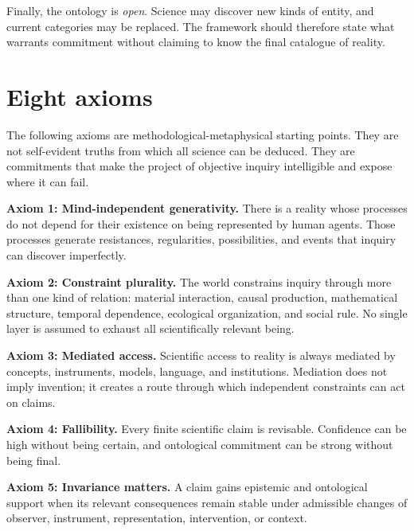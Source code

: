Finally, the ontology is \emph{open}. Science may discover new kinds of entity,
and current categories may be replaced. The framework should therefore state
what warrants commitment without claiming to know the final catalogue of
reality.

\section{Eight axioms}

The following axioms are methodological-metaphysical starting points. They are
not self-evident truths from which all science can be deduced. They are
commitments that make the project of objective inquiry intelligible and expose
where it can fail.

\begin{principlebox}
\textbf{Axiom 1: Mind-independent generativity.} There is a reality whose
processes do not depend for their existence on being represented by human
agents. Those processes generate resistances, regularities, possibilities, and
events that inquiry can discover imperfectly.
\end{principlebox}

\begin{principlebox}
\textbf{Axiom 2: Constraint plurality.} The world constrains inquiry through
more than one kind of relation: material interaction, causal production,
mathematical structure, temporal dependence, ecological organization, and
social rule. No single layer is assumed to exhaust all scientifically relevant
being.
\end{principlebox}

\begin{principlebox}
\textbf{Axiom 3: Mediated access.} Scientific access to reality is always
mediated by concepts, instruments, models, language, and institutions. Mediation
does not imply invention; it creates a route through which independent
constraints can act on claims.
\end{principlebox}

\begin{principlebox}
\textbf{Axiom 4: Fallibility.} Every finite scientific claim is revisable.
Confidence can be high without being certain, and ontological commitment can
be strong without being final.
\end{principlebox}

\begin{principlebox}
\textbf{Axiom 5: Invariance matters.} A claim gains epistemic and ontological
support when its relevant consequences remain stable under admissible changes
of observer, instrument, representation, intervention, or context.
\end{principlebox}

